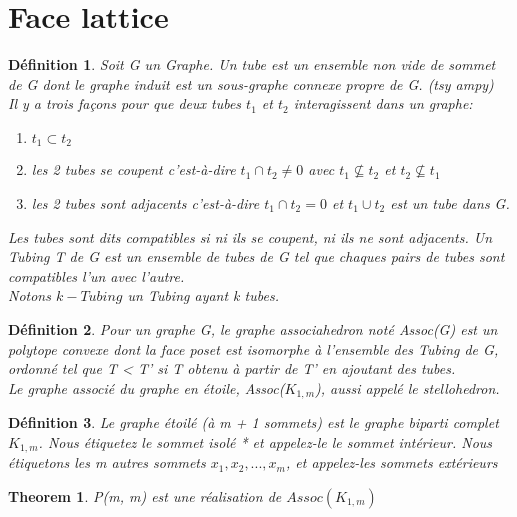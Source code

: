 \documentclass{book}
\newtheorem{theorem}{Theorem}[section]
\newtheorem{petit_nom2}{Définition}[chapter]
\begin{document}
\section{Face lattice}
\begin{petit_nom2}
Soit G un Graphe. Un \textit{tube} est un ensemble non vide de sommet de G dont le graphe induit est un sous-graphe connexe propre de G. (tsy ampy)\\
Il y a trois façons pour que deux tubes $t_1$ et $t_2$ interagissent dans un graphe:
\begin{enumerate}
\item $t_1 \subset t_2$
\item les 2 tubes se coupent c'est-à-dire $t_1 \cap t_2 \neq 0$ avec $ t_1 \nsubseteq t_2$ et $t_2 \nsubseteq t_1 $
\item les 2 tubes sont adjacents c'est-à-dire $t_1 \cap t_2 = 0$ et $t_1 \cup t_2$ est un tube dans G. 
\end{enumerate}
Les tubes sont dits compatibles si ni ils se coupent, ni ils ne sont adjacents. Un Tubing T de G est un ensemble 
de tubes de G tel que chaques pairs de tubes sont compatibles  l'un avec l'autre.\\
Notons $k-Tubing$ un Tubing ayant k tubes.\\
\end{petit_nom2}

\begin{petit_nom2}
  Pour un graphe G, le graphe associahedron noté \textit{Assoc(G)} est un polytope convexe dont la face poset est isomorphe à l'ensemble des Tubing de G, ordonné tel que T < T'
  si T obtenu à partir de T' en ajoutant des tubes.\\
  Le graphe associé du graphe en étoile, Assoc($K_{1,m}$), aussi appelé le \textit{stellohedron}.\\
\end{petit_nom2}

\begin{petit_nom2}
  Le graphe étoilé (à m + 1 sommets) est le graphe biparti complet $K_{1,m}$. Nous
étiquetez le sommet isolé * et appelez-le le sommet intérieur. Nous étiquetons les m autres sommets $x_1, x_2, . . . , x_m$,
et appelez-les sommets extérieurs
\end{petit_nom2}

\begin{theorem}
  P(m, m) est une réalisation de $Assoc(K_{1,m})$
\end{theorem}
\end{document}
